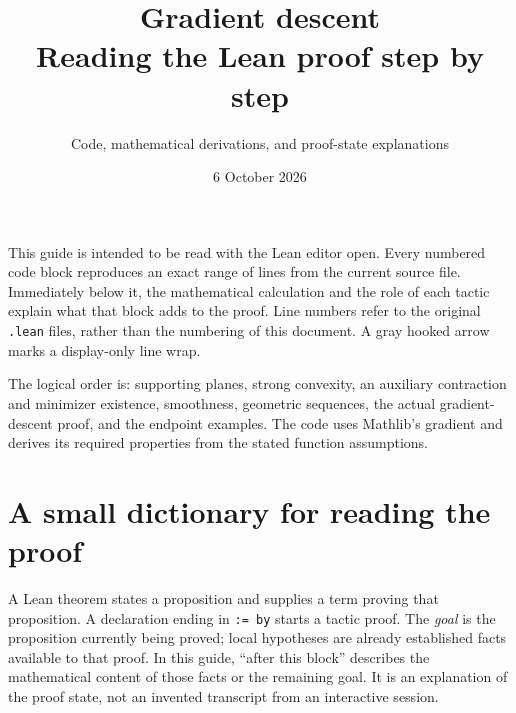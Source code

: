 \documentclass[11pt,a4paper]{article}
\title{Gradient descent\\Reading the Lean proof step by step}
\author{Code, mathematical derivations, and proof-state explanations}
\date{6 October 2026}
\newcommand{\lean}[1]{\ifmmode\text{\nolinkurl{#1}}\else\nolinkurl{#1}\fi}
\begin{document}
\maketitle
This guide is intended to be read with the Lean editor open. Every numbered
code block reproduces an exact range of lines from the current source file.
Immediately below it, the mathematical calculation and the role of each tactic
explain what that block adds to the proof. Line numbers refer to the original
\lean{.lean} files, rather than the numbering of this document. A gray hooked
arrow marks a display-only line wrap.

The logical order is: supporting planes, strong convexity, an auxiliary
contraction and minimizer existence, smoothness, geometric sequences, the
actual gradient-descent proof, and the endpoint examples. The code uses
Mathlib's gradient and derives its required properties from the stated
function assumptions.
\tableofcontents
\clearpage


\section{A small dictionary for reading the proof}

A Lean theorem states a proposition and supplies a term proving that
proposition. A declaration ending in \lean{:= by} starts a tactic proof.
The \emph{goal} is the proposition currently being proved; local hypotheses
are already established facts available to that proof. In this guide,
``after this block'' describes the mathematical content of those facts or
the remaining goal. It is an explanation of the proof state, not an invented
transcript from an interactive session.
\end{document}
